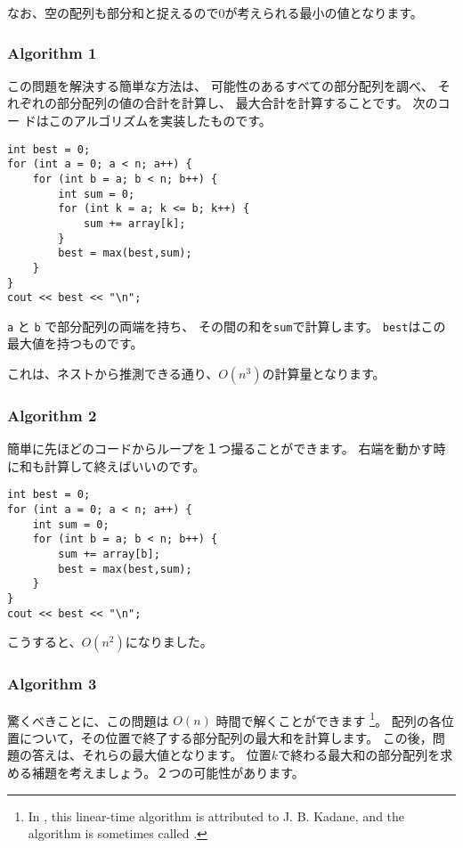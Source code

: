 なお、空の配列も部分和と捉えるので$0$が考えられる最小の値となります。

\subsubsection{Algorithm 1}

この問題を解決する簡単な方法は、
可能性のあるすべての部分配列を調べ、
それぞれの部分配列の値の合計を計算し、
最大合計を計算することです。
次のコー ドはこのアルゴリズムを実装したものです。

\begin{lstlisting}
int best = 0;
for (int a = 0; a < n; a++) {
    for (int b = a; b < n; b++) {
        int sum = 0;
        for (int k = a; k <= b; k++) {
            sum += array[k];
        }
        best = max(best,sum);
    }
}
cout << best << "\n";
\end{lstlisting}

\texttt{a} と \texttt{b} で部分配列の両端を持ち、
その間の和を\texttt{sum}で計算します。
\texttt{best}はこの最大値を持つものです。

これは、ネストから推測できる通り、$O(n^3)$の計算量となります。

\subsubsection{Algorithm 2}

簡単に先ほどのコードからループを１つ撮ることができます。
右端を動かす時に和も計算して終えばいいのです。

\begin{lstlisting}
int best = 0;
for (int a = 0; a < n; a++) {
    int sum = 0;
    for (int b = a; b < n; b++) {
        sum += array[b];
        best = max(best,sum);
    }
}
cout << best << "\n";
\end{lstlisting}
こうすると、$O(n^2)$になりました。

\subsubsection{Algorithm 3}

驚くべきことに、この問題は $O(n)$ 時間で解くことができます
\footnote{In \cite{ben86}, this linear-time algorithm
is attributed to J. B. Kadane, and the algorithm is sometimes
called  .}。
配列の各位置について，その位置で終了する部分配列の最大和を計算します。
この後，問題の答えは、それらの最大値となります。
位置$k$で終わる最大和の部分配列を求める補題を考えましょう。２つの可能性があります。

